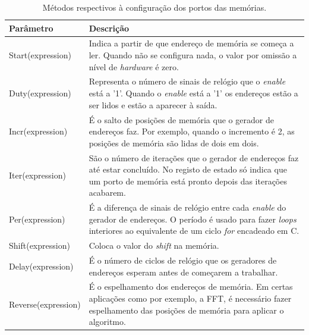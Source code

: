 \begin{table}[h!]
    \caption[Métodos respectivos à configuração dos portos das memórias.]{Métodos respectivos à configuração dos portos das memórias.}
  \begin{center}
    \begin{tabular}{|l|L{10cm}|}
      \hline
       {\bf Parâmetro} & {\bf Descrição} \\
      \hline \hline
      Start(expression) & Indica a partir de que endereço de memória se começa a ler. Quando não se configura nada, o valor por omissão a nível de {\it hardware} é zero. \\
       Duty(expression) & Representa o número de sinais de relógio que o {\it enable} está a '1'. Quando o {\it enable} está a '1' os endereços estão a ser lidos e estão a aparecer à saída. \\
      Incr(expression) & É o salto de posições de memória que o gerador de endereços faz. Por exemplo, quando o incremento é 2, as posições de memória são lidas de dois em dois. \\
       Iter(expression) & São o número de iterações que o gerador de endereços faz até estar concluído. No registo de estado só indica que um porto de memória está pronto depois
das iterações acabarem. \\
      Per(expression) & É a diferença de sinais de relógio entre cada {\it enable} do gerador de endereços. O período é usado para fazer {\it loops} interiores ao equivalente de um ciclo {\it for} encadeado em C. \\
       Shift(expression) & Coloca o valor do {\it shift} na memória. \\
      Delay(expression) & É o número de ciclos de relógio que os geradores de endereços esperam antes de começarem a trabalhar.  \\
      Reverse(expression) & É o espelhamento dos endereços de memória. Em certas aplicações como por exemplo, a FFT, é necessário fazer espelhamento das posições de
memória para aplicar o algoritmo. \\
     
      \hline
    \end{tabular}
  \end{center}
  \label{tab:MemParameter}
\end{table}


